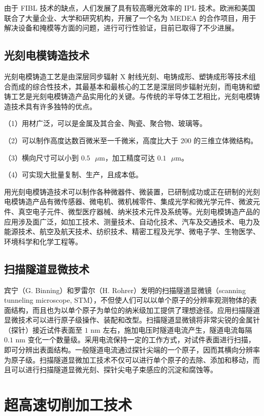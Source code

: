 \documentclass[UTF8]{ctexbook}
\newcommand{\◎}{\ensuremath{\bigcirc}}
\begin{document}
由于 FIBL 技术的缺点，人们发展了具有较高曝光效率的 IPL 技术。欧洲和美国联合了大量企业、大学和研究机构，开展了一个名为 MEDEA 的合作项目，用于解决设备和掩模等方面的问题，进行可行性验证，目前已取得了不少进展。

\subsection{光刻电模铸造技术}

光刻电模铸造工艺是由深层同步辐射 X 射线光刻、电铸成形、塑铸成形等技术组合而成的综合性技术，其最基本和最核心的工艺是深层同步辐射光刻，而电铸和塑铸工艺是光刻电模铸造产品实用化的关键。与传统的半导体工艺相比，光刻电模铸造技术具有许多独特的优点。

（1）用材广泛，可以是金属及其合金、陶瓷、聚合物、玻璃等。

（2）可以制作高度达数百微米至一千微米，高度比大于 200 的三维立体微结构。

（3）横向尺寸可以小到 $0.5\text{ }\mu\text{m}$，加工精度可达 $0.1\text{ }\mu\text{m}$。

（4）可实现大批量复制、生产，且成本低。

用光刻电模铸造技术可以制作各种微器件、微装置，已研制成功或正在研制的光刻电模铸造产品有微传感器、微电机、微机械零件、集成光学和微光学元件、微波元件、真空电子元件、微型医疗器械、纳米技术元件及系统等。光刻电模铸造产品的应用涉及面广泛，如加工技术、测量技术、自动化技术、汽车及交通技术、电力及能源技术、航空及航天技术、纺织技术、精密工程及光学、微电子学、生物医学、环境科学和化学工程等。

\subsection{扫描隧道显微技术}

宾宁（G. Binning）和罗雷尔（H. Rohrer）发明的扫描隧道显微镜（scanning tunneling microscope, STM），不但使人们可以以单个原子的分辨率观测物体的表面结构，而且也为以单个原子为单位的纳米级加工提供了理想途径。应用扫描隧道显微技术可以进行原子级操作、装配和改型。扫描隧道显微镜将非常尖锐的金属针（探针）接近试件表面至 $1\text{ nm}$ 左右，施加电压时隧道电流产生，隧道电流每隔 $0.1\text{ nm}$ 变化一个数量级。采用电流保持一定的工作方式，对试件表面进行扫描，即可分辨出表面结构。一般隧道电流通过探针尖端的一个原子，因而其横向分辨率为原子级。扫描隧道显微加工技术不仅可以进行单个原子的去除、添加和移动，而且可以进行扫描隧道显微光刻、探针尖电子束感应的沉淀和腐蚀等。

\section{超高速切削加工技术}
\end{document}
